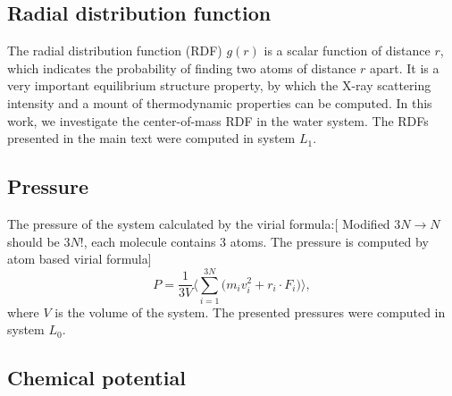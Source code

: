 \documentclass[a4paper,preprint,unsortedaddress,onecolumn,fleqn]{revtex4}
\newcommand{\recheck}[1]{{\color{red} #1}}
\begin{document}
\subsection{Radial distribution function}

The radial distribution function (RDF) $g(r)$ is a scalar function of
distance $r$, which indicates the probability of finding two atoms of
distance $r$ apart. It is a very important equilibrium structure property,
by which the X-ray scattering intensity and a mount of thermodynamic
properties can be computed. In this work, we investigate the center-of-mass
RDF in the water system. The RDFs presented in the main text were computed
in system $L_1$.


\subsection{Pressure}

The pressure of the system calculated by the virial formula:[ {\color{blue}
Modified $3N\longrightarrow N$} \recheck{should be $3N$!, each molecule contains 3 atoms. The pressure is computed by atom based virial formula}]%
\begin{equation*}
P=\frac{1}{3V}\Bigg\langle\sum_{i=1}^{3N}\Big(m_{i}\mathbf{\mathit{v}}%
_{i}^{2}+\mathbf{\mathit{r}}_{i}\cdot \mathbf{\mathit{F}}_{i}\Big)%
\Bigg\rangle,
\end{equation*}%
where $V$ is the volume of the system. The presented pressures were computed
in system $L_{0}$.

\subsection{Chemical potential}
\end{document}

